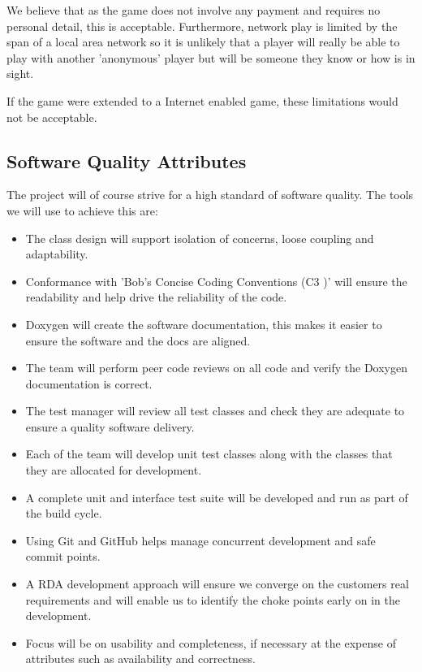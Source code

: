 \documentclass[a4paper,10pt]{article}
\begin{document}
We believe that as the game does not involve any payment and requires no personal detail, this is acceptable. Furthermore, network play is limited by the span of a local area network so it is unlikely that a player will really be able to play with another 'anonymous' player but will be someone they know or how is in sight.

If the game were extended to a Internet enabled game, these limitations would not be acceptable. 

\subsection{Software Quality Attributes}

The project will of course strive for a high standard of software quality. The tools we will use to achieve this are:


\begin{itemize}
  \item The class design will support isolation of concerns, loose coupling and adaptability. 
  \item Conformance with    'Bob’s Concise Coding Conventions (C3 )' \cite{bobsccc} will ensure the readability and help drive the reliability of the code.
\item Doxygen will create the software documentation, this makes it easier to ensure the software and the docs are aligned.
\item The team will perform peer code reviews on all code and verify the Doxygen documentation is correct.
\item The test manager will review all test classes and check they are adequate to ensure a quality software delivery. 
  \item Each of the team will develop unit test classes along with the classes that they are allocated for development.
\item A complete unit and interface test suite will be developed and run as part of the build cycle. 
\item Using Git and GitHub helps  manage concurrent development and safe commit points. 
\item A RDA development approach will ensure we converge on the customers real requirements and will enable us to identify the choke points early on in the development. 
\item Focus will be on usability and completeness, if necessary at the expense of attributes such as availability and correctness. 
\end{itemize}
\end{document}
